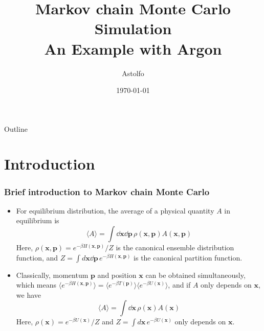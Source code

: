 \documentclass[10pt,t]{beamer}
\title{{\Large Markov chain Monte Carlo Simulation  \\
\vspace{0.5em} An Example with Argon}}
\author{Astolfo}
\date{\today}
\begin{document}

{

\begin{frame}
    \titlepage
\end{frame}
}

\begin{frame}{Outline}
\hfill {\parbox{1.0\textwidth}{\tableofcontents[hideothersubsections]}}
\end{frame}

\section{Introduction}

{
\begin{frame}
\frametitle{Brief introduction to Markov chain Monte Carlo}
\begin{itemize}
\vspace{-0.6em}
\setlength\itemsep{1em}
    \item For equilibrium distribution, the average of a physical quantity
$A$ in equilibrium is
    \begin{equation*}
        \langle A \rangle = \int \dd \mathbf{x} \dd \mathbf{p} \, \rho(\mathbf{x},\mathbf{p}) A(\mathbf{x},\mathbf{p})
    \end{equation*}
    Here, $\rho(\mathbf{x},\mathbf{p}) = e^{-\beta H(\mathbf{x},\mathbf{p})}/Z$ is the canonical ensemble distribution function, and $Z = \int d\mathbf{x}  \dd \mathbf{p} \, e^{-\beta H(\mathbf{x},\mathbf{p})}$ is the canonical partition function.
    \item Classically, momentum $\mathbf{p}$ and position $\mathbf{x}$ can be obtained simultaneously, which means $\langle e^{-\beta H(\mathbf{x},\mathbf{p})}\rangle=\langle e^{-\beta T(\mathbf{p})} \rangle \langle e^{-\beta U(\mathbf{x})}\rangle$, and if $A$ only depends on $\mathbf{x}$, we have
    \begin{equation*}
        \langle A \rangle = \int \dd \mathbf{x} \, \rho(\mathbf{x}) A(\mathbf{x})
    \end{equation*}
    Here, $\rho(\mathbf{x}) = e^{-\beta U(\mathbf{x})}/Z$ and $Z = \int d\mathbf{x} \, e^{-\beta U(\mathbf{x})}$ only depends on $\mathbf{x}$.
\end{itemize}
\end{frame}
}
\end{document}
